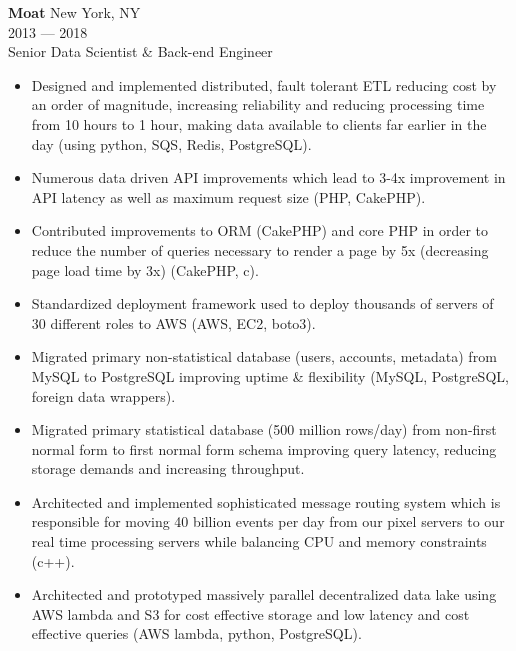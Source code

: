 \myfontsize{\bigheader}
\textbf{Moat}
\myfontsize{\bodysize}
New York, NY\\
2013 --- 2018\\
Senior Data Scientist \& Back-end Engineer\\

\begin{itemize}[topsep=1ex, partopsep=0ex, parsep=0ex, itemsep=0.5ex]
    \item Designed and implemented distributed, fault tolerant ETL reducing cost by an order of magnitude, increasing reliability and reducing processing time from {\mytilde}10 hours to {\mytilde}1 hour, making data available to clients far earlier in the day (using python, SQS, Redis, PostgreSQL).
    \item Numerous data driven API improvements which lead to 3-4x improvement in API latency as well as maximum request size (PHP, CakePHP).
    \item Contributed improvements to ORM (CakePHP) and core PHP in order to reduce the number of queries necessary to render a page by 5x (decreasing page load time by {\mytilde}3x) (CakePHP, c).
    \item Standardized deployment framework used to deploy thousands of servers of {\mytilde}30 different roles to AWS (AWS, EC2, boto3).
    \item Migrated primary non-statistical database (users, accounts, metadata) from MySQL to PostgreSQL improving uptime \& flexibility (MySQL, PostgreSQL, foreign data wrappers).
    \item Migrated primary statistical database (500 million rows/day) from non-first normal form to first normal form schema improving query latency, reducing storage demands and increasing throughput.
    \item Architected and implemented sophisticated message routing system which is responsible for moving {\mytilde}40 billion events per day from our pixel servers to our real time processing servers while balancing CPU and memory constraints (c++).
    \item Architected and prototyped massively parallel decentralized data lake using AWS lambda and S3 for cost effective storage and low latency and cost effective queries (AWS lambda, python, PostgreSQL).
\end{itemize}

\vspace{\littleskip}


